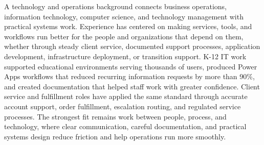 
%



\justifying\noindent
A technology and operations background connects business operations, information technology, computer science, and technology management with practical systems work. Experience has centered on making services, tools, and workflows run better for the people and organizations that depend on them, whether through steady client service, documented support processes, application development, infrastructure deployment, or transition support. K-12 IT work supported educational environments serving thousands of users, produced Power Apps workflows that reduced recurring information requests by more than 90\%, and created documentation that helped staff work with greater confidence. Client service and fulfillment roles have applied the same standard through accurate account support, order fulfillment, escalation routing, and regulated service processes. The strongest fit remains work between people, process, and technology, where clear communication, careful documentation, and practical systems design reduce friction and help operations run more smoothly.


